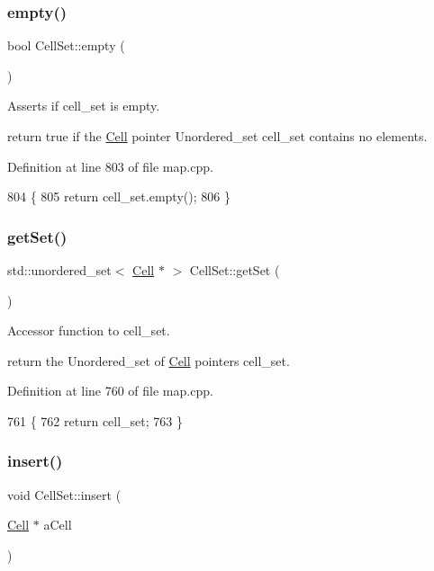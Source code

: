 \subsubsection{\texorpdfstring{empty()}{empty()}}
{\footnotesize\ttfamily bool Cell\+Set\+::empty (\begin{DoxyParamCaption}{ }\end{DoxyParamCaption})}



Asserts if cell\+\_\+set is empty. 

return true if the \hyperlink{class_cell}{Cell} pointer Unordered\+\_\+set cell\+\_\+set contains no elements. 

Definition at line 803 of file map.\+cpp.


\begin{DoxyCode}
804 \{
805     \textcolor{keywordflow}{return} cell\_set.empty();
806 \}
\end{DoxyCode}
\hypertarget{class_cell_set_a16ffb9da795fb77b5214ff0ad276c325}{}\label{class_cell_set_a16ffb9da795fb77b5214ff0ad276c325} 
\subsubsection{\texorpdfstring{get\+Set()}{getSet()}}
{\footnotesize\ttfamily std\+::unordered\+\_\+set$<$ \hyperlink{class_cell}{Cell} $\ast$ $>$ Cell\+Set\+::get\+Set (\begin{DoxyParamCaption}{ }\end{DoxyParamCaption})}



Accessor function to cell\+\_\+set. 

return the Unordered\+\_\+set of \hyperlink{class_cell}{Cell} pointers cell\+\_\+set. 

Definition at line 760 of file map.\+cpp.


\begin{DoxyCode}
761 \{
762     \textcolor{keywordflow}{return} cell\_set;
763 \}
\end{DoxyCode}
\hypertarget{class_cell_set_a589f95793822a6c76b45ab3c5cadeda3}{}\label{class_cell_set_a589f95793822a6c76b45ab3c5cadeda3} 
\subsubsection{\texorpdfstring{insert()}{insert()}}
{\footnotesize\ttfamily void Cell\+Set\+::insert (\begin{DoxyParamCaption}\item[{\hyperlink{class_cell}{Cell} $\ast$}]{a\+Cell }\end{DoxyParamCaption})}



